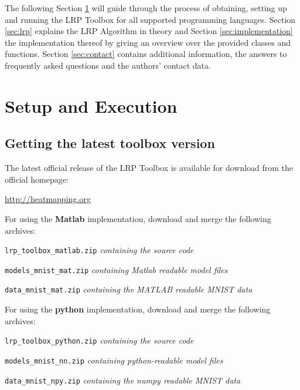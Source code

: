\documentclass[a4wide]{article}
\begin{document}
The following Section \ref{sec:setup} will guide through the process of obtaining, setting up and running the LRP Toolbox for all supported programming languages. Section \ref{sec:lrp} explains the LRP Algorithm in theory and Section \ref{sec:implementation} the implementation thereof by giving an overview over the provided classes and functions. Section \ref{sec:contact} contains additional information, the answers to frequently asked questions and the authors' contact data.



\section{Setup and Execution}
\label{sec:setup}

\subsection*{Getting the latest toolbox version}
The latest official release of the LRP Toolbox is available for download from the official homepage:
\begin{center}
\url{http://heatmapping.org}
\end{center}

For using the \textbf{Matlab} implementation, download and merge the following archives:

\texttt{lrp\_toolbox\_matlab.zip} \emph{containing the source code}


\texttt{models\_mnist\_mat.zip} \emph{containing Matlab readable model files}


\texttt{data\_mnist\_mat.zip} \emph{containing the MATLAB readable MNIST data}



\vspace{0.5cm}
For using the \textbf{python} implementation, download and merge the following archives:

\texttt{lrp\_toolbox\_python.zip} \emph{containing the source code}

\texttt{models\_mnist\_nn.zip} \emph{containing python-readable model files}


\texttt{data\_mnist\_npy.zip} \emph{containing the numpy readable MNIST data}
\end{document}
